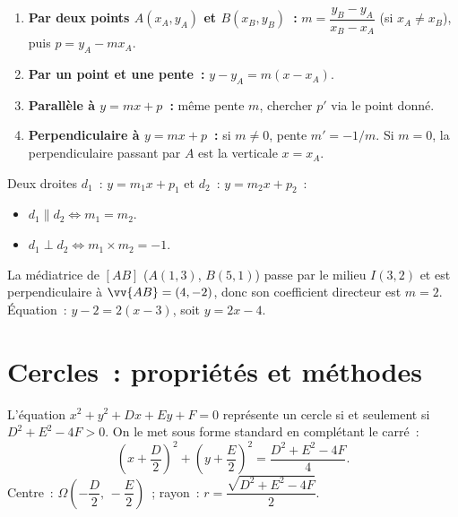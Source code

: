 \begin{methode}
\begin{enumerate}
  \item \textbf{Par deux points $A(x_A,y_A)$ et $B(x_B,y_B)$~:}
        $m = \dfrac{y_B-y_A}{x_B-x_A}$ (si $x_A\ne x_B$),
        puis $p = y_A - mx_A$.
  \item \textbf{Par un point et une pente~:}
        $y - y_A = m(x-x_A)$.
  \item \textbf{Parall\`ele \`a $y=mx+p$~:} m\^eme pente $m$, chercher $p'$
        via le point donn\'e.
  \item \textbf{Perpendiculaire \`a $y=mx+p$~:} si $m\ne0$, pente $m'=-1/m$.
        Si $m=0$, la perpendiculaire passant par $A$ est la verticale $x=x_A$.
\end{enumerate}
\end{methode}

\begin{prop}
Deux droites $d_1$~: $y=m_1x+p_1$ et $d_2$~: $y=m_2x+p_2$~:
\begin{itemize}
  \item $d_1 \parallel d_2 \Leftrightarrow m_1=m_2$.
  \item $d_1 \perp d_2 \Leftrightarrow m_1\times m_2 = -1$.
\end{itemize}
\end{prop}

\begin{ex}
La m\'ediatrice de $[AB]$ ($A(1,3)$, $B(5,1)$) passe par le milieu
$I(3,2)$ et est perpendiculaire \`a $\vv{AB}=(4,-2)$,
donc son coefficient directeur est $m=2$.
\'Equation~: $y-2 = 2(x-3)$, soit $y=2x-4$.
\end{ex}

\section{Cercles~: propri\'et\'es et m\'ethodes}

\begin{methode}
L'\'equation $x^2+y^2+Dx+Ey+F=0$ repr\'esente un cercle si et seulement si
$D^2+E^2-4F > 0$.
On le met sous forme standard en compl\'etant le carr\'e~:
$$\left(x+\frac{D}{2}\right)^2+\left(y+\frac{E}{2}\right)^2 = \frac{D^2+E^2-4F}{4}.$$
Centre~: $\Omega\!\left(-\dfrac{D}{2},\,-\dfrac{E}{2}\right)$~;
rayon~: $r=\dfrac{\sqrt{D^2+E^2-4F}}{2}$.
\end{methode}

